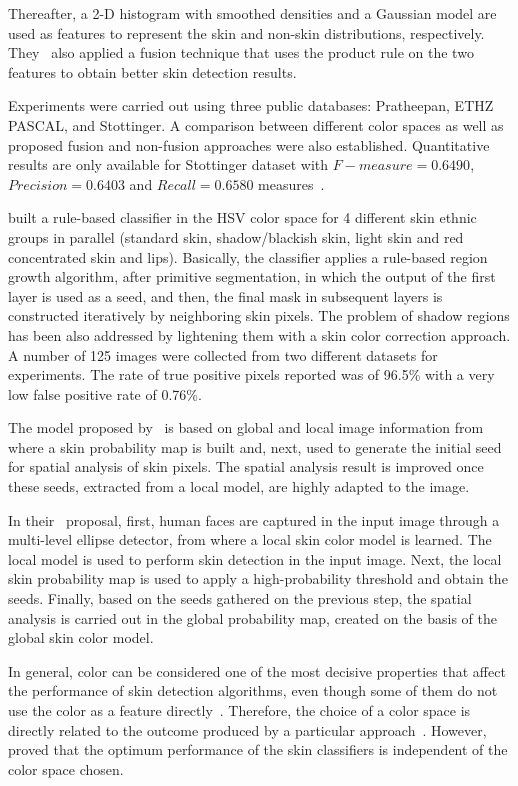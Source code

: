 Thereafter, a 2-D histogram with smoothed densities and a Gaussian model are used as features to represent the skin and non-skin distributions, respectively. They~\citep{tan:12} also applied a fusion technique that uses the product rule on the two features to obtain better skin detection results.

Experiments were carried out using three public databases: Pratheepan, ETHZ PASCAL, and Stottinger. A comparison between different color spaces as well as proposed fusion and non-fusion approaches were also established. Quantitative results are only available for Stottinger dataset with $F-measure = 0.6490$, $Precision = 0.6403$ and $Recall = 0.6580$ measures~\citep{tan:12}.

\citet{naji:12} built a rule-based classifier in the HSV color space for 4 different skin ethnic groups in parallel (standard skin, shadow/blackish skin, light skin and red concentrated skin and lips). Basically, the classifier applies a rule-based region growth algorithm, after primitive segmentation, in which the output of the first layer is used as a seed, and then, the final mask in subsequent layers is constructed iteratively by neighboring skin pixels. The problem of shadow regions has been also addressed by lightening them with a skin color correction approach. A number of 125 images were collected from two different datasets for experiments. The rate of true positive pixels reported was of 96.5\% with a very low false positive rate of 0.76\%.

The model proposed by~\citet{kawulok:13} is based on global and local image information from where a skin probability map is built and, next, used to generate the initial seed for spatial analysis of skin pixels. The spatial analysis result is improved once these seeds, extracted from a local model, are highly adapted to the image.

In their~\citep{kawulok:13} proposal, first, human faces are captured in the input image through a multi-level ellipse detector, from where a local skin color model is learned. The local model is used to perform skin detection in the input image. Next, the local skin probability map is used to apply a high-probability threshold and obtain the seeds. Finally, based on the seeds gathered on the previous step, the spatial analysis is carried out in the global probability map, created on the basis of the global skin color model.

In general, color can be considered one of the most decisive properties that affect the performance of skin detection algorithms, even though some of them do not use the color as a feature directly~\citep{mahmoodi:16}. Therefore, the choice of a color space is directly related to the outcome produced by a particular approach~\citep{mahmoodi:16}. However, \citet{albiol:01} proved that the optimum performance of the skin classifiers is independent of the color space chosen.


